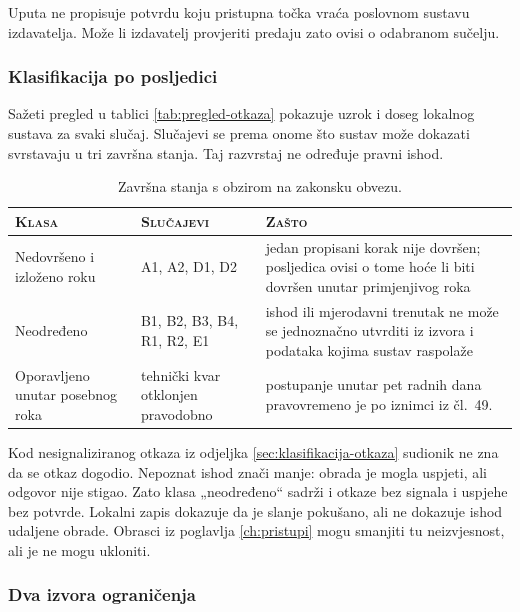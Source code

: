 Uputa ne propisuje potvrdu koju pristupna točka vraća poslovnom sustavu
izdavatelja. Može li izdavatelj provjeriti predaju zato ovisi o odabranom
sučelju.

\subsubsection*{Klasifikacija po posljedici}

Sažeti pregled u tablici \ref{tab:pregled-otkaza} pokazuje uzrok i doseg
lokalnog sustava za svaki slučaj. Slučajevi se prema onome što sustav može
dokazati svrstavaju u tri završna stanja. Taj razvrstaj ne određuje pravni
ishod.

\begin{table}[htbp]
\centering
\caption[Završna stanja izvedenih načina otkazivanja]{Završna stanja s
obzirom na zakonsku obvezu.}
\label{tab:posljedice}
\small
\begin{tabular}{@{}>{\raggedright\arraybackslash}p{}p{}p{}@{}}
\toprule
\textsc{Klasa} & \textsc{Slučajevi} & \textsc{Zašto} \\
\midrule
Nedovršeno i izloženo roku & A1, A2, D1, D2 &
jedan propisani korak nije dovršen; posljedica ovisi o tome hoće li biti
dovršen unutar primjenjivog roka \\
\addlinespace
Neodređeno & B1, B2, B3, B4, R1, R2, E1 &
ishod ili mjerodavni trenutak ne može se jednoznačno utvrditi iz izvora i
podataka kojima sustav raspolaže \\
\addlinespace
Oporavljeno unutar posebnog roka & tehnički kvar otklonjen pravodobno &
postupanje unutar pet radnih dana pravovremeno je po iznimci iz
čl.~49. \\
\bottomrule
\end{tabular}
\end{table}

Kod nesignaliziranog otkaza iz odjeljka
\ref{sec:klasifikacija-otkaza} sudionik ne zna da se otkaz dogodio.
Nepoznat ishod znači manje: obrada je mogla uspjeti, ali odgovor nije
stigao. Zato klasa „neodređeno“ sadrži i otkaze bez signala i uspjehe bez
potvrde. Lokalni zapis dokazuje da je slanje pokušano, ali ne dokazuje ishod
udaljene obrade. Obrasci iz poglavlja \ref{ch:pristupi} mogu smanjiti tu
neizvjesnost, ali je ne mogu ukloniti.

\subsubsection*{Dva izvora ograničenja}
\label{sec:dvije-vrste}

